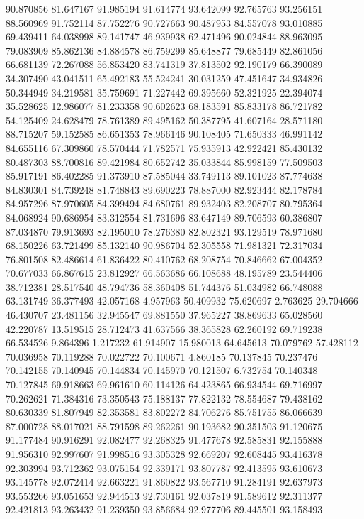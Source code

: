 90.870856
81.647167
91.985194
91.614774
93.642099
92.765763
93.256151
88.560969
91.752114
87.752276
90.727663
90.487953
84.557078
93.010885
69.439411
64.038998
89.141747
46.939938
62.471496
90.024844
88.963095
79.083909
85.862136
84.884578
86.759299
85.648877
79.685449
82.861056
66.681139
72.267088
56.853420
83.741319
37.813502
92.190179
66.390089
34.307490
43.041511
65.492183
55.524241
30.031259
47.451647
34.934826
50.344949
34.219581
35.759691
71.227442
69.395660
52.321925
22.394074
35.528625
12.986077
81.233358
90.602623
68.183591
85.833178
86.721782
54.125409
24.628479
78.761389
89.495162
50.387795
41.607164
28.571180
88.715207
59.152585
86.651353
78.966146
90.108405
71.650333
46.991142
84.655116
67.309860
78.570444
71.782571
75.935913
42.922421
85.430132
80.487303
88.700816
89.421984
80.652742
35.033844
85.998159
77.509503
85.917191
86.402285
91.373910
87.585044
33.749113
89.101023
87.774638
84.830301
84.739248
81.748843
89.690223
78.887000
82.923444
82.178784
84.957296
87.970605
84.399494
84.680761
89.932403
82.208707
80.795364
84.068924
90.686954
83.312554
81.731696
83.647149
89.706593
60.386807
87.034870
79.913693
82.195010
78.276380
82.802321
93.129519
78.971680
68.150226
63.721499
85.132140
90.986704
52.305558
71.981321
72.317034
76.801508
82.486614
61.836422
80.410762
68.208754
70.846662
67.004352
70.677033
66.867615
23.812927
66.563686
66.108688
48.195789
23.544406
38.712381
28.517540
48.794736
58.360408
51.744376
51.034982
66.748088
63.131749
36.377493
42.057168
4.957963
50.409932
75.620697
2.763625
29.704666
46.430707
23.481156
32.945547
69.881550
37.965227
38.869633
65.028560
42.220787
13.519515
28.712473
41.637566
38.365828
62.260192
69.719238
66.534526
9.864396
1.217232
61.914907
15.980013
64.645613
70.079762
57.428112
70.036958
70.119288
70.022722
70.100671
4.860185
70.137845
70.237476
70.142155
70.140945
70.144834
70.145970
70.121507
6.732754
70.140348
70.127845
69.918663
69.961610
60.114126
64.423865
66.934544
69.716997
70.262621
71.384316
73.350543
75.188137
77.822132
78.554687
79.438162
80.630339
81.807949
82.353581
83.802272
84.706276
85.751755
86.066639
87.000728
88.017021
88.791598
89.262261
90.193682
90.351503
91.120675
91.177484
90.916291
92.082477
92.268325
91.477678
92.585831
92.155888
91.956310
92.997607
91.998516
93.305328
92.669207
92.608445
93.416378
92.303994
93.712362
93.075154
92.339171
93.807787
92.413595
93.610673
93.145778
92.072414
92.663221
91.860822
93.567710
91.284191
92.637973
93.553266
93.051653
92.944513
92.730161
92.037819
91.589612
92.311377
92.421813
93.263432
91.239350
93.856684
92.977706
89.445501
93.158493
